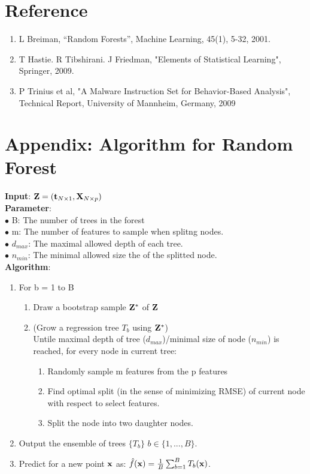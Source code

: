 \documentclass[11pt]{article}
\theoremstyle{definition}
\begin{document}
\clearpage
\section*{\textbf{Reference}}
\begin{enumerate}
\item L Breiman, “Random Forests”, Machine Learning, 45(1), 5-32, 2001. 
\item T Hastie. R Tibshirani. J Friedman, "Elements of Statistical Learning", Springer, 2009.
\item P Trinius et al, "A Malware Instruction Set for Behavior-Based Analysis", Technical Report, University of Mannheim, Germany, 2009
\end{enumerate}


\section*{\textbf{Appendix: Algorithm for Random Forest}}
\textbf{Input}: ${\bf Z} = ({\bf t}_{N \times 1}, {\bf X}_{N \times p})$\\

\textbf{Parameter}:\\
$\bullet$ B: The number of trees in the forest\\
$\bullet$ m: The number of features to sample when splitng nodes.\\
$\bullet$ $d_{max}$: The maximal allowed depth of each tree. \\
$\bullet$ $n_{min}$: The minimal allowed size the of the splitted node.\\

\textbf{Algorithm}:
\begin{enumerate}
\item For b = 1 to B
	\begin{enumerate}
	\item Draw a bootstrap sample ${\bf Z}^*$ of ${\bf Z}$
	\item (Grow a regression tree $T_b$ using ${\bf Z}^*$)\\
	Untile maximal depth of tree ($d_{max}$)/minimal size of node ($n_{min}$) is reached, for every node in current tree:
	\begin{enumerate}
		\item Randomly sample m features from the p features
		\item Find optimal split (in the sense of minimizing RMSE) of current node with respect to select features.
		\item Split the node into two daughter nodes.
	\end{enumerate}
	\end{enumerate}
\item Output the ensemble of trees $\{T_b\}$ $b \in \{1, ..., B\}$.
\item Predict for a new point ${\bf x}$ as: 
$\hat{f}({\bf x}) = \frac{1}{B} \sum_{b=1}^B T_b({\bf x})$.
\end{enumerate}
\end{document}
